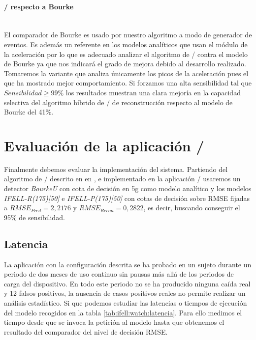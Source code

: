 
\paragraph{\ifell/ respecto a Bourke}\\
El comparador de Bourke es usado por nuestro algoritmo a modo de generador de eventos. Es además un referente en los modelos analíticos que usan el módulo de la aceleración por lo que es adecuado analizar el algoritmo de \ifell/ contra el modelo de Bourke ya que nos indicará el grado de mejora debido al desarrollo realizado. Tomaremos la variante que analiza únicamente los picos de la aceleración pues el que ha mostrado mejor comportamiento. Si forzamos una alta sensibilidad tal que $Sensibilidad \geq 99\%$ los resultados muestran una clara mejoría en la capacidad selectiva del algoritmo híbrido de \ifell/ de reconstrucción respecto al modelo de Bourke del 41\%. 


\section{Evaluación de la aplicación \ifell/}

  Finalmente debemos evaluar la implementación del sistema. Partiendo del algoritmo de \ifell/ descrito en en , e implementado en la aplicación \ifell/ usaremos un detector \textit{BourkeU} con cota de decisión en 5g como modelo analítico y los modelos \textit{IFELL-R(175)[50]} e \textit{IFELL-P(175)[50]} con cotas de decisión sobre RMSE fijadas a $RMSE_{Pred}=2,2176$ y $RMSE_{Recon}=0,2822$, es decir, buscando conseguir el 95\% de sensibilidad.

\subsection{Latencia}
    La aplicación con la configuración descrita se ha probado en un sujeto durante un periodo de dos meses de uso continuo sin pausas más allá de los periodos de carga del dispositivo. En todo este periodo no se ha producido ninguna caída real y 12 falsos positivos, la ausencia de casos positivos reales no permite realizar un análisis estadístico. Si que podemos estudiar las latencias o tiempos de ejecución del modelo recogidos en la tabla \ref{tab:ifell:watch:latencia}. Para ello medimos el tiempo desde que se invoca la petición al modelo hasta que obtenemos el resultado del comparador del nivel de decisión RMSE. 

